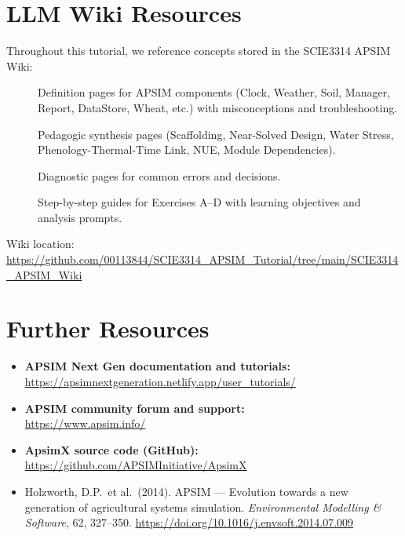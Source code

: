 
\chapter{LLM Wiki Resources}
\label{sec:wiki-resources}

Throughout this tutorial, we reference concepts stored in the SCIE3314 APSIM Wiki:

\begin{description}
  \item[] Definition pages for APSIM components (Clock, Weather, Soil, Manager, Report, DataStore, Wheat, etc.) with misconceptions and troubleshooting.
  \item[] Pedagogic synthesis pages (Scaffolding, Near-Solved Design, Water Stress, Phenology-Thermal-Time Link, NUE, Module Dependencies).
  \item[] Diagnostic pages for common errors and decisions.
  \item[] Step-by-step guides for Exercises A--D with learning objectives and analysis prompts.
\end{description}

Wiki location: \url{https://github.com/00113844/SCIE3314_APSIM_Tutorial/tree/main/SCIE3314_APSIM_Wiki}


\chapter{Further Resources}

\begin{itemize}
  \item \textbf{APSIM Next Gen documentation and tutorials:}\\
        \url{https://apsimnextgeneration.netlify.app/user_tutorials/}
  \item \textbf{APSIM community forum and support:}\\
        \url{https://www.apsim.info/}
  \item \textbf{ApsimX source code (GitHub):}\\
        \url{https://github.com/APSIMInitiative/ApsimX}
  \item Holzworth, D.P.\ et al.\ (2014). APSIM --- Evolution towards a new generation
        of agricultural systems simulation.
        \textit{Environmental Modelling \& Software}, 62, 327--350.
        \url{https://doi.org/10.1016/j.envsoft.2014.07.009}
\end{itemize}

